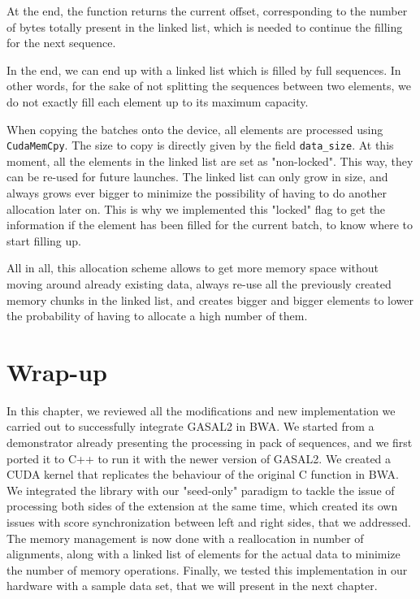 At the end, the function returns the current offset, corresponding to the number of bytes totally present in the linked list, which is needed to continue the filling for the next sequence.

In the end, we can end up with a linked list which is filled by full sequences. In other words, for the sake of not splitting the sequences between two elements, we do not exactly fill each element up to its maximum capacity. 

When copying the batches onto the device, all elements are processed using \verb|CudaMemCpy|. The size to copy is directly given by the field \verb|data_size|. At this moment, all the elements in the linked list are set as "non-locked". This way, they can be re-used for future launches. The linked list can only grow in size, and always grows ever bigger to minimize the possibility of having to do another allocation later on. This is why we implemented this "locked" flag to get the information if the element has been filled for the current batch, to know where to start filling up.

All in all, this allocation scheme allows to get more memory space without moving around already existing data, always re-use all the previously created memory chunks in the linked list, and creates bigger and bigger elements to lower the probability of having to allocate a high number of them.

\section*{Wrap-up}
In this chapter, we reviewed all the modifications and new implementation we carried out to successfully integrate GASAL2 in BWA. We started from a demonstrator already presenting the processing in pack of sequences, and we first ported it to C++ to run it with the newer version of GASAL2. We created a CUDA kernel that replicates the behaviour of the original C function in BWA. We integrated the library with our "seed-only" paradigm to tackle the issue of processing both sides of the extension at the same time, which created its own issues with score synchronization between left and right sides, that we addressed. The memory management is now done with a reallocation in number of alignments, along with a linked list of elements for the actual data to minimize the number of memory operations. Finally, we tested this implementation in our hardware with a sample data set, that we will present in the next chapter.


